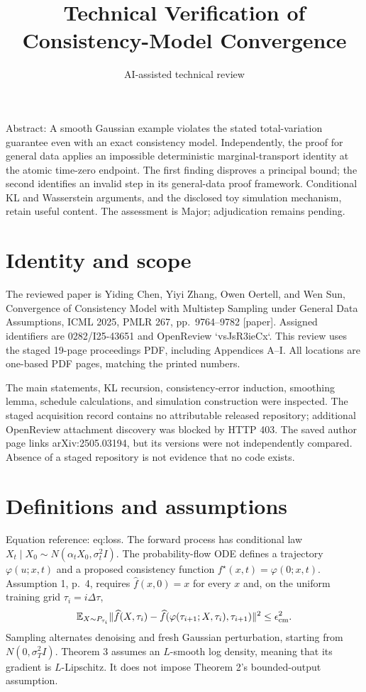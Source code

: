 \documentclass[10pt]{article}
\title{Technical Verification of Consistency-Model Convergence}
\author{AI-assisted technical review}
\date{}
\begin{document}
\maketitle
Abstract: A smooth Gaussian example violates the stated total-variation guarantee even with an exact consistency model. Independently, the proof for general data applies an impossible deterministic marginal-transport identity at the atomic time-zero endpoint. The first finding disproves a principal bound; the second identifies an invalid step in its general-data proof framework. Conditional KL and Wasserstein arguments, and the disclosed toy simulation mechanism, retain useful content. The assessment is Major; adjudication remains pending.\par
\section*{Identity and scope}
The reviewed paper is Yiding Chen, Yiyi Zhang, Owen Oertell, and Wen Sun, Convergence of Consistency Model with Multistep Sampling under General Data Assumptions, ICML 2025, PMLR 267, pp. 9764–9782 [paper]. Assigned identifiers are 0282/I25-43651 and OpenReview `vsJsR3ieCx`. This review uses the staged 19-page proceedings PDF, including Appendices A–I. All locations are one-based PDF pages, matching the printed numbers.\par
The main statements, KL recursion, consistency-error induction, smoothing lemma, schedule calculations, and simulation construction were inspected. The staged acquisition record contains no attributable released repository; additional OpenReview attachment discovery was blocked by HTTP 403. The saved author page links arXiv:2505.03194, but its versions were not independently compared. Absence of a staged repository is not evidence that no code exists.\par
\section*{Definitions and assumptions}
Equation reference: eq:loss. The forward process has conditional law \(X_t\mid X_0\sim N(\alpha_tX_0,\sigma_t^2I)\). The probability-flow ODE defines a trajectory \(\varphi(u;x,t)\) and a proposed consistency function \(f^\star(x,t)=\varphi(0;x,t)\). Assumption 1, p. 4, requires \(\widehat f(x,0)=x\) for every \(x\) and, on the uniform training grid \(\tau_i=i\Delta\tau\), \[
\mathbb E_{X\sim P_{\tau_i}}
\|\widehat f(X,\tau_i)-
\widehat f(\varphi(\tau_{i+1};X,\tau_i),\tau_{i+1})\|^2
\le\epsilon_{\rm cm}^2 .\] Sampling alternates denoising and fresh Gaussian perturbation, starting from \(N(0,\sigma_T^2I)\). Theorem 3 assumes an \(L\)-smooth log density, meaning that its gradient is \(L\)-Lipschitz. It does not impose Theorem 2’s bounded-output assumption.\par
\end{document}
